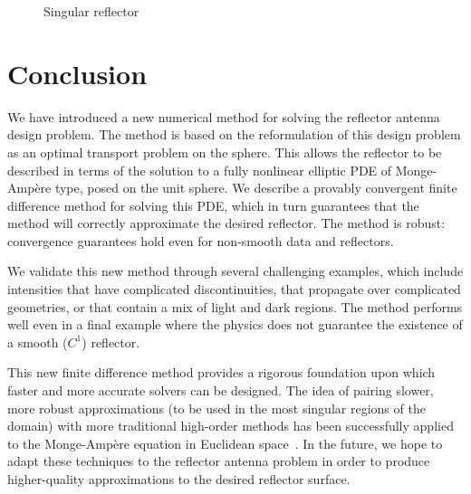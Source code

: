 \documentclass{amsart}
\newcommand{\MA}{Monge-Amp\`ere\xspace}
\theoremstyle{lemma}
\theoremstyle{remark}
\begin{document}
\begin{figure}
	\caption{Singular reflector}\label{fig:triangle}
\end{figure}




\section{Conclusion}\label{sec:conclusion}
We have introduced a new numerical method for solving the reflector antenna design problem.  The method is based on the reformulation of this design problem as an optimal transport problem on the sphere.  This allows the reflector to be described in terms of the solution to a fully nonlinear elliptic PDE of \MA type, posed on the unit sphere.  We describe a provably convergent finite difference method for solving this PDE, which in turn guarantees that the method will correctly approximate the desired reflector.  The method is robust: convergence guarantees hold even for non-smooth data and reflectors.

We validate this new method through several challenging examples, which include intensities that have complicated discontinuities, that propagate over complicated geometries, or that contain a mix of light and dark regions.  The method performs well even in a final example where the physics does not guarantee the existence of a smooth ($C^1$) reflector.

This new finite difference method provides a rigorous foundation upon which faster and more accurate solvers can be designed.  The idea of pairing slower, more robust approximations (to be used in the most singular regions of the domain) with more traditional high-order methods has been successfully applied to the \MA equation in Euclidean space~\cite{FO_FilteredSchemes}.  In the future, we hope to adapt these techniques to the reflector antenna problem in order to produce higher-quality approximations to the desired reflector surface.






%
\end{document}
